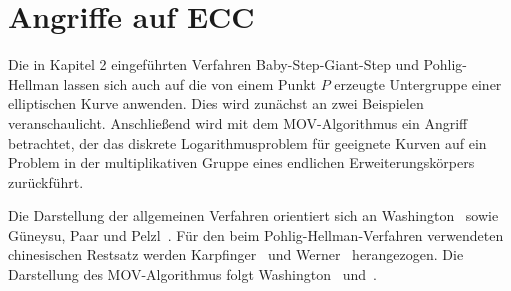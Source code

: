 \section{Angriffe auf ECC}
Die in Kapitel 2 eingeführten Verfahren Baby-Step-Giant-Step
und Pohlig-Hellman lassen sich auch auf die von einem Punkt
$P$ erzeugte Untergruppe einer elliptischen Kurve anwenden.
Dies wird zunächst an zwei Beispielen veranschaulicht. Anschließend
wird mit dem MOV-Algorithmus ein Angriff betrachtet, der das
diskrete Logarithmusproblem für geeignete Kurven auf ein
Problem in der multiplikativen Gruppe eines endlichen Erweiterungskörpers zurückführt.

Die Darstellung der allgemeinen Verfahren orientiert sich an
Washington~\cite[S.~146--153]{washington08} sowie Güneysu,
Paar und Pelzl~\cite[S.~256]{guneysu24}. Für den beim
Pohlig-Hellman-Verfahren verwendeten chinesischen Restsatz
werden Karpfinger~\cite[S.~90]{karpf24} und Werner~\cite[S.~114--116]{werner02} herangezogen. Die Darstellung
des MOV-Algorithmus folgt Washington~\cite[S.~156--157]{washington08} und~\cite[S.~83--89]{werner02}.

